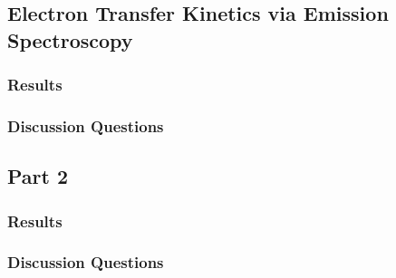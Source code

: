 

\subsection{Electron Transfer Kinetics via Emission Spectroscopy}
\subsubsection*{Results}

\subsubsection*{Discussion Questions}

\subsection{Part 2}
\subsubsection{Results}

\subsubsection*{Discussion Questions}







